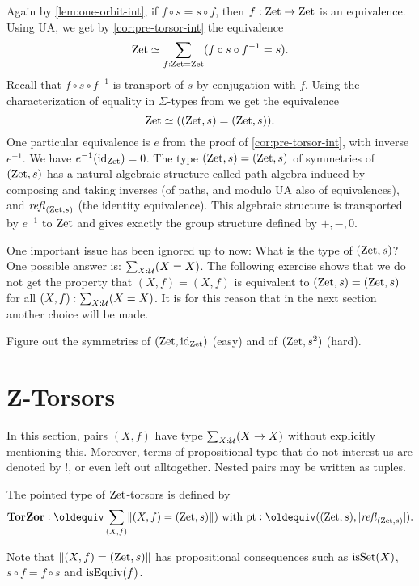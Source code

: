 \documentclass[a4,12pt]{amsart}
\begin{document}
Again by \cref{lem:one-orbit-int}, if $f\circ s = s\circ f$,
then $f: \mathrm{Zet}\to\mathrm{Zet}$ is an equivalence. 
Using UA, we get by \cref{cor:pre-torsor-int} the equivalence
\[
\mathrm{Zet}\simeq \sum_{f:\mathrm{Zet}=\mathrm{Zet}} (f\circ s \circ f^{-1} = s).
\]
Recall that $f\circ s \circ f^{-1}$ is transport of $s$ by
conjugation with $f$. Using the characterization of equality 
in $\Sigma$-types from \cite[Theorem 2.7.2]{hottbook} we get the equivalence
\[
\mathrm{Zet}\simeq ((\mathrm{Zet},s) = (\mathrm{Zet},s)).
\]
One particular equivalence is $e$ from the proof
of \cref{cor:pre-torsor-int}, with inverse $e^{-1}$.
We have $e^{-1}(\mathord{\mathrm{id}}_{\mathrm{Zet}}) = 0$.
The type $(\mathrm{Zet},s) = (\mathrm{Zet},s)$ of symmetries of $(\mathrm{Zet},s)$
has a natural algebraic structure called path-algebra
induced by composing and taking inverses (of paths,
and modulo UA also of equivalences), and $\mathop{{\it refl}_{(\mathrm{Zet},s)}}$
(the identity equivalence).
This algebraic structure is transported by $e^{-1}$ to $\mathrm{Zet}$
and gives exactly the group structure defined by ${+},{-},0$.

One important issue has been ignored up to now:
What is the type of $(\mathrm{Zet},s)$? 
One possible answer is: $\sum_{X:\mathcal{U}}(X=X)$.
The following exercise shows that we do not get the 
property that $(X,f)=(X,f)$ is equivalent to
$(\mathrm{Zet},s) = (\mathrm{Zet},s)$ for all $(X,f) : \sum_{X:\mathcal{U}}(X=X)$.
It is for this reason that in the next section
another choice will be made.

\begin{xca}\label{xca:zet-symmetries}
Figure out the symmetries of $(\mathrm{Zet},\mathord{\mathrm{id}}_{\mathrm{Zet}})$ (easy) and 
of $(\mathrm{Zet},s^2)$ (hard).
\end{xca}

\section{Z-Torsors}\label{sec:ZTorsors}

In this section, pairs $(X,f)$ have type $\sum_{X:\mathcal{U}}(X\to X)$
without explicitly mentioning this. Moreover, terms of
propositional type that do not interest us are denoted by $!$,
or even left out alltogether. Nested pairs may be written as tuples.

\begin{definition}\label{sec:ZTors}
The pointed type of $\mathrm{Zet}$-torsors is defined by
\[
\TorZ\defeq \sum_{(X,f)}\Trunc{(X,f)=(\zet,s)}) \text{~with~}
\pt\defeq ((\zet,s),\trunc{\refl{(\zet,s)}}).
\]
\end{definition}
Note that $\lVert(X,f)=(\mathrm{Zet},s)\rVert$ has propositional consequences
such as $\mathrm{isSet}(X)$, $s\circ f = f \circ s$  and $\mathrm{isEquiv}(f)$.
\end{document}
